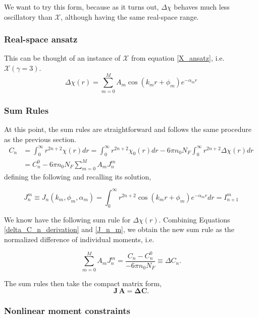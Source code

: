 \documentclass[aps,onecolumn]{revtex4-2}
\begin{document}
We want to try this form, because as it turns out, $\Delta \chi$ behaves much less oscillatory than $\mathcal{X}$, although having the same real-space range.

\subsubsection{Real-space ansatz}
This can be thought of an instance of $\mathcal{X}$ from equation \eqref{X_ansatz}, i.e. $\mathcal{X}(\gamma=3)$.
\begin{equation}\label{delta_chi_ansatz}
    \Delta{\chi}(r)=\sum_{m=0}^M A_m \cos{(k_mr +\phi_m)}e^{-\alpha_m r}
\end{equation}

\subsubsection{Sum Rules}
At this point, the sum rules are straightforward and follows the same procedure as the previous section.
\begin{align} \label{delta_C_n_derivation}
    C_n & = \int_0^\infty r^{2n+2}\chi(r)dr = \int_0^\infty r^{2n+2}\chi_0(r)dr - 6\pi n_0 N_F  \int_0^\infty r^{2n+2}\Delta{\chi}(r)dr \nonumber \\
        & = C_n^0 -6\pi n_0 N_F \sum_{m=0}^M A_m J_n^m
\end{align}
defining the following and recalling its solution,


\begin{equation} \label{J_n_m}
    J^m_n\equiv J_n(k_m,\phi_m,\alpha_m) =\int_0^\infty r^{2n+2}\cos{(k_mr +\phi_m)}e^{-\alpha_m r} dr = I^m_{n+1}
\end{equation}

We know have the following sum rule for $\Delta{\chi}(r)$. Combining Equations \eqref{delta_C_n_derivation} and \eqref{J_n_m}, we obtain the new sum rule as the normalized difference of individual moments, i.e.

\begin{equation}
    \sum_{m=0}^MA_mJ^m_n= \frac{C_n - C_n^0}{-6\pi n_0 N_F} \equiv \Delta C_n.
\end{equation}

The sum rules then take the compact matrix form,
\begin{equation}
    \mathbf J\,\mathbf A = \mathbf{\Delta C}.
    \label{eq:matrix_sum_rules2}
\end{equation}

\subsubsection{Nonlinear moment constraints}
\end{document}
